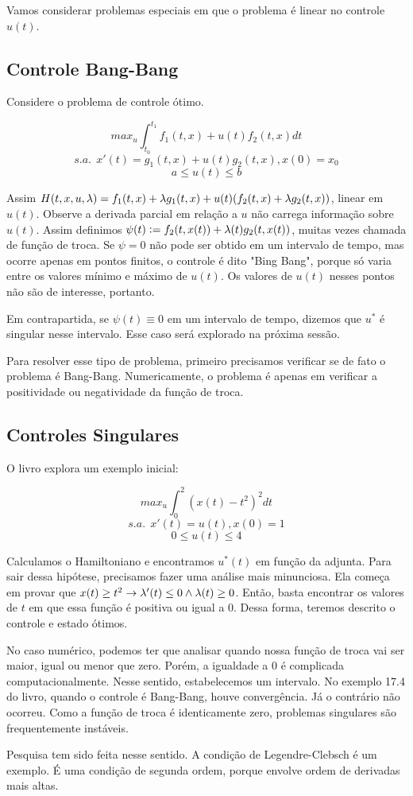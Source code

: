 Vamos considerar problemas especiais em que o problema é linear 
no controle $u(t)$. 

\subsection{Controle Bang-Bang}

Considere o problema de controle ótimo.

$$max_u \int_{t_0}^{t_1} f_1(t,x) + u(t)f_2(t,x) dt$$
$$s.a.~~x'(t) = g_1(t,x) + u(t)g_2(t,x), x(0) = x_0$$
$$ a \leq u(t) \leq b$$

Assim $H(t,x,u,\lambda) = f_1(t,x) + \lambda g_1(t,x) + u(t)(f_2(t,x) + \lambda g_2(t,x))$, 
linear em $u(t)$. Observe a derivada parcial em relação a $u$ não
carrega informação sobre $u(t)$. Assim definimos $\psi(t) := f_2(t,x(t)) + \lambda(t)g_2(t,x(t))$,
muitas vezes chamada de função de troca. Se $\psi = 0$ não pode ser obtido 
em um intervalo de tempo, mas ocorre apenas em pontos finitos, o controle
é dito "Bing Bang", porque só varia entre os valores mínimo e máximo de $u(t)$. 
Os valores de $u(t)$ nesses pontos não são de interesse, portanto. 

Em contrapartida, se $\psi(t) \equiv 0$ em um intervalo de tempo, dizemos que $u^*$ é 
singular nesse intervalo. Esse caso será explorado na próxima sessão. 

Para resolver esse tipo de problema, primeiro precisamos verificar se de fato 
o problema é Bang-Bang. Numericamente, o problema é apenas em verificar a positividade
ou negatividade da função de troca. 

\subsection{Controles Singulares}

O livro explora um exemplo inicial:

$$max_u \int_0^2 (x(t) - t^2)^2 dt $$
$$s.a. ~~ x'(t) = u(t), x(0) = 1$$
$$0 \leq u(t) \leq 4$$

Calculamos o Hamiltoniano e encontramos $u^*(t)$ em função da adjunta. 
Para sair dessa hipótese, precisamos fazer uma análise mais minunciosa. 
Ela começa em provar que $x(t) \geq t^2 \rightarrow \lambda'(t) \leq 0 \wedge \lambda(t) \geq 0$. 
Então, basta encontrar os valores de $t$ em que essa função é positiva 
ou igual a $0$. Dessa forma, teremos descrito o controle e estado ótimos.

No caso numérico, podemos ter que analisar quando nossa função de troca vai ser 
maior, igual ou menor que zero. Porém, a igualdade a $0$ é complicada computacionalmente. 
Nesse sentido, estabelecemos um intervalo. No exemplo 17.4 do livro, quando o controle é 
Bang-Bang, houve convergência. Já o contrário não ocorreu. Como a função de troca é 
identicamente zero, problemas singulares são frequentemente instáveis. 

Pesquisa tem sido feita nesse sentido. A condição de Legendre-Clebsch é um exemplo. É uma
condição de segunda ordem, porque envolve ordem de derivadas mais altas.